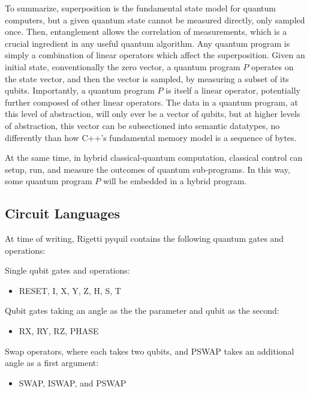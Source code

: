\documentclass[a4paper,twocolumn,11pt,accepted=2017-05-09]{quantumarticle}
\begin{document}
To summarize, superposition is the fundamental state model for quantum computers, but a given quantum state cannot be measured directly, only sampled once.
Then, entanglement allows the correlation of measurements, which is a crucial ingredient in any useful quantum algorithm. 
Any quantum program is simply a combination of linear operators which affect the superposition.
Given an initial state, conventionally the zero vector, a quantum program $P$ operates on the state vector, and then the vector is sampled, by measuring a subset of its qubits.
Importantly, a quantum program $P$ is itself a linear operator, potentially further composed of other linear operators.
The data in a quantum program, at this level of abstraction, will only ever be a vector of qubits, but at higher levels of abstraction, this vector can be subsectioned into semantic datatypes, no differently than how C++'s fundamental memory model is a sequence of bytes.

At the same time, in hybrid classical-quantum computation, classical control can setup, run, and measure the outcomes of quantum sub-programs.
In this way, some quantum program $P$ will be embedded in a hybrid program.

\subsection{Circuit Languages}

At time of writing, Rigetti pyquil contains the following quantum gates and operations:

Single qubit gates and operations:

\begin{itemize}
    \item RESET, I, X, Y, Z, H, S, T
\end{itemize}

Qubit gates taking an angle as the the parameter and qubit as the second:

\begin{itemize}
    \item RX, RY, RZ, PHASE
\end{itemize}

Swap operators, where each takes two qubits, and PSWAP takes an additional angle as a first argument:

\begin{itemize}
    \item SWAP, ISWAP, and PSWAP
\end{itemize}
\end{document}
